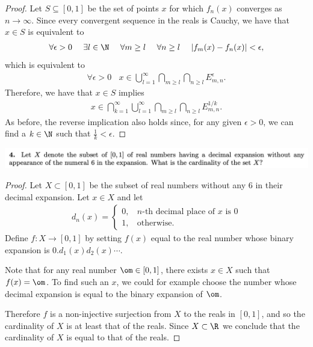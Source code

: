 \begin{proof}
  Let $S \subseteq [0, 1]$ be the set of points $x$ for which $f_n(x)$ converges as $n \to \infty$. Since every
  convergent sequence in the reals is Cauchy, we have that $x \in S$ is equivalent to
  \begin{align*}
    \forall \epsilon > 0 ~~~~ \exists l \in \N ~~~~ \forall m \geq l ~~~~ \forall n \geq l ~~~~ |f_m(x) - f_n(x)| < \epsilon,
  \end{align*}
  which is equivalent to
  \begin{align*}
    \forall \epsilon > 0 ~~~~ x \in \bigcup_{l=1}^\infty \bigcap_{m \geq l} \bigcap_{n \geq l} E_{m,n}^\epsilon.
  \end{align*}
  Therefore, we have that $x \in S$ implies
  \begin{align*}
    x \in \bigcap_{k=1}^\infty \bigcup_{l=1}^\infty \bigcap_{m \geq l} \bigcap_{n \geq l} E_{m,n}^{1/k}.
  \end{align*}
  As before, the reverse implication also holds since, for any given $\epsilon > 0$, we can find a $k \in \N$
  such that $\frac{1}{k} < \epsilon$.
\end{proof}

\newpage
\begin{mdframed}
  \includegraphics[width=400pt]{img/analysis--berkeley-202a--homework-1-f175.png}
\end{mdframed}


\begin{proof}
  Let $X \subset [0, 1]$ be the subset of real numbers without any 6 in their decimal expansion. Let $x \in X$ and let
  \begin{align*}
    d_n(x) =
    \begin{cases}
      0, ~~~~ n\text{-th decimal place of }x \text{ is }0\\
      1, ~~~~ \text{otherwise}.
    \end{cases}
  \end{align*}
  Define $f: X \to [0, 1]$ by setting $f(x)$ equal to the real number whose binary expansion
  is $0.d_1(x)d_2(x)\cdots$.

  Note that for any real number $\om \in [0, 1]$, there exists $x \in X$ such that $f(x) = \om$. To find such
  an $x$, we could for example choose the number whose decimal expansion is equal to the binary expansion
  of $\om$.

  Therefore $f$ is a non-injective surjection from $X$ to the reals in $[0, 1]$, and so the cardinality of $X$
  is at least that of the reals. Since $X \subset \R$ we conclude that the cardinality of $X$ is equal to that
  of the reals.
\end{proof}

